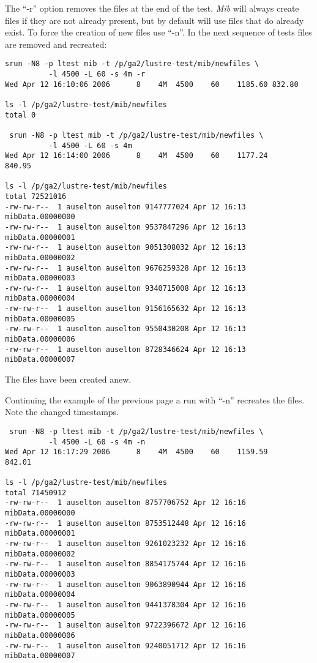 \documentclass{article}
\begin{document}
The ``-r'' option removes the files at the end of the test.  {\em Mib}
will always create files if they are not already present, but by
default will use files that do already exist.  To force the creation
of new files use ``-n''.  In the next sequence of tests files are
removed and recreated:
{\small
  \begin{verbatim}
srun -N8 -p ltest mib -t /p/ga2/lustre-test/mib/newfiles \
          -l 4500 -L 60 -s 4m -r     
Wed Apr 12 16:10:06 2006      8    4M  4500    60    1185.60 832.80

ls -l /p/ga2/lustre-test/mib/newfiles
total 0

 srun -N8 -p ltest mib -t /p/ga2/lustre-test/mib/newfiles \
          -l 4500 -L 60 -s 4m
Wed Apr 12 16:14:00 2006      8    4M  4500    60    1177.24     840.95

ls -l /p/ga2/lustre-test/mib/newfiles
total 72521016
-rw-rw-r--  1 auselton auselton 9147777024 Apr 12 16:13 mibData.00000000
-rw-rw-r--  1 auselton auselton 9537847296 Apr 12 16:13 mibData.00000001
-rw-rw-r--  1 auselton auselton 9051308032 Apr 12 16:13 mibData.00000002
-rw-rw-r--  1 auselton auselton 9676259328 Apr 12 16:13 mibData.00000003
-rw-rw-r--  1 auselton auselton 9340715008 Apr 12 16:13 mibData.00000004
-rw-rw-r--  1 auselton auselton 9156165632 Apr 12 16:13 mibData.00000005
-rw-rw-r--  1 auselton auselton 9550430208 Apr 12 16:13 mibData.00000006
-rw-rw-r--  1 auselton auselton 8728346624 Apr 12 16:13 mibData.00000007
  \end{verbatim}
}
The files have been created anew.

\pagebreak
Continuing the example of the previous page a run with ``-n'' recreates
the files.  Note the changed timestamps.
{\small
  \begin{verbatim}
 srun -N8 -p ltest mib -t /p/ga2/lustre-test/mib/newfiles \
          -l 4500 -L 60 -s 4m -n
Wed Apr 12 16:17:29 2006      8    4M  4500    60    1159.59     842.01

ls -l /p/ga2/lustre-test/mib/newfiles
total 71450912
-rw-rw-r--  1 auselton auselton 8757706752 Apr 12 16:16 mibData.00000000
-rw-rw-r--  1 auselton auselton 8753512448 Apr 12 16:16 mibData.00000001
-rw-rw-r--  1 auselton auselton 9261023232 Apr 12 16:16 mibData.00000002
-rw-rw-r--  1 auselton auselton 8854175744 Apr 12 16:16 mibData.00000003
-rw-rw-r--  1 auselton auselton 9063890944 Apr 12 16:16 mibData.00000004
-rw-rw-r--  1 auselton auselton 9441378304 Apr 12 16:16 mibData.00000005
-rw-rw-r--  1 auselton auselton 9722396672 Apr 12 16:16 mibData.00000006
-rw-rw-r--  1 auselton auselton 9240051712 Apr 12 16:16 mibData.00000007
  \end{verbatim}
}
\end{document}

